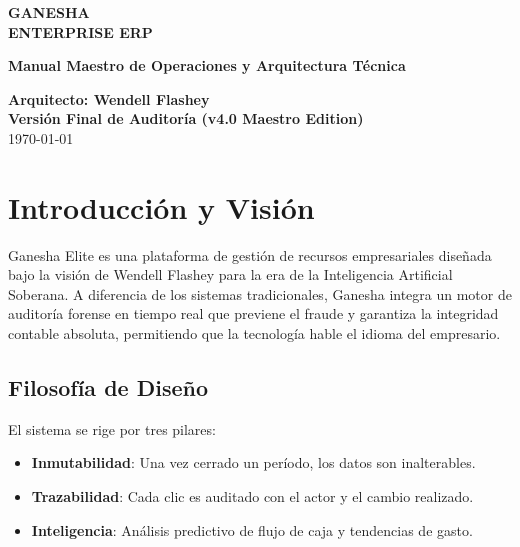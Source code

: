 \documentclass[12pt, a4paper, oneside]{book}
\begin{document}
\pagecolor{brandblack}
\color{brandwhite}

\begin{titlepage}
    \centering
    \vspace*{2cm}
    {\fontsize{50}{60}\selectfont\bfseries\color{brandorange} GANESHA}\\[0.5cm]
    {\Huge\bfseries ENTERPRISE ERP}\\[2cm]
    
    \begin{tcolorbox}[colback=brandgray, colframe=brandorange, arc=10pt]
        \centering
        \Large\textbf{Manual Maestro de Operaciones y Arquitectura Técnica}
    \end{tcolorbox}
    
    {\Large \textbf{Arquitecto: Wendell Flashey}}\\[0.5cm]
    {\Large \textbf{Versión Final de Auditoría (v4.0 Maestro Edition)}}\\[0.5cm]
    {\large \today}
\end{titlepage}

\tableofcontents
\newpage

\chapter{Introducción y Visión}
Ganesha Elite es una plataforma de gestión de recursos empresariales diseñada bajo la visión de Wendell Flashey para la era de la Inteligencia Artificial Soberana. A diferencia de los sistemas tradicionales, Ganesha integra un motor de auditoría forense en tiempo real que previene el fraude y garantiza la integridad contable absoluta, permitiendo que la tecnología hable el idioma del empresario.

\section{Filosofía de Diseño}
El sistema se rige por tres pilares:
\begin{itemize}
    \item \textbf{Inmutabilidad}: Una vez cerrado un período, los datos son inalterables.
    \item \textbf{Trazabilidad}: Cada clic es auditado con el actor y el cambio realizado.
    \item \textbf{Inteligencia}: Análisis predictivo de flujo de caja y tendencias de gasto.
\end{itemize}
\end{document}
